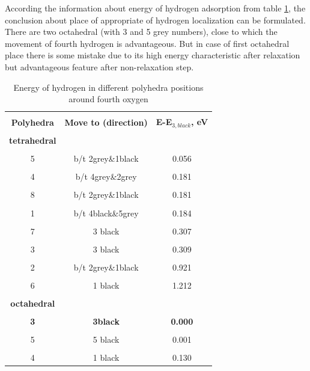 According the information about energy of hydrogen adsorption from table \ref{energy4}, the conclusion about place of appropriate of hydrogen localization can be formulated. There are two octahedral (with 3 and 5 grey numbers), close to which the movement of fourth hydrogen is advantageous. But in case of first octahedral place there is some mistake due to its high energy characteristic after relaxation but advantageous feature after non-relaxation step. 

\begin{table}[h]
\scriptsize{
\caption{Energy of hydrogen in different polyhedra positions around fourth oxygen}
\label{energy4}
\begin{center}
\begin{tabular}{|c|c|c|}
\hline
& & \\
 \textbf{Polyhedra} & \textbf{Move to (direction)} & \textbf{E-E$_{3,black}$, eV}\\ 
\hline
& & \\
 \textbf{tetrahedral}  &  & \\ 
\hline
& & \\
5 & b/t 2grey\&1black & 0.056 \\
\hline
& & \\
4 & b/t 4grey\&2grey & 0.181 \\
\hline
& & \\
8 & b/t 2grey\&1black & 0.181 \\
\hline
& & \\
1 & b/t 4black\&5grey & 0.184 \\
\hline
& &\\
7 & 3 black & 0.307 \\
\hline
& &\\
3 & 3 black & 0.309 \\
\hline
& &\\
2 & b/t 2grey\&1black & 0.921 \\
\hline
& &\\
6 & 1 black & 1.212 \\
\hline
& & \\
\textbf{octahedral} & & \\
\hline
& & \\
\textbf{3} & \textbf{3black} & \textbf{0.000} \\
\hline
& & \\
5 & 5 black & 0.001 \\
\hline
& & \\
4 & 1 black & 0.130 \\
\hline
\end{tabular}
\end{center}
}
\end{table}

